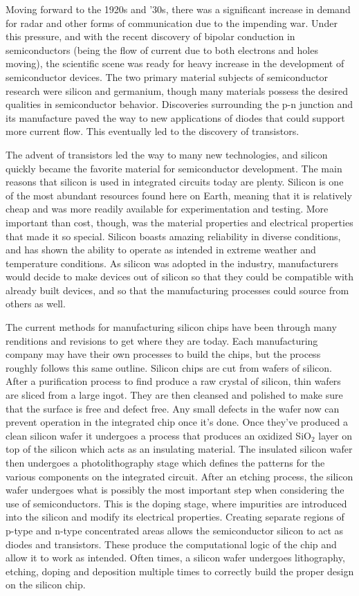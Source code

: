 \documentclass[12pt]{article}
\begin{document}
\begin{flushleft}
Moving forward to the 1920s and '30s, there was a significant
increase in demand for radar and other forms of communication
due to the impending war. Under this pressure, and
with the recent discovery of bipolar conduction in
semiconductors (being the flow of current due to both
electrons and holes moving), the scientific scene was
ready for heavy increase in the development of semiconductor
devices. The two primary material subjects of semiconductor
research were silicon and germanium, though many materials
possess the desired qualities in semiconductor behavior.
Discoveries surrounding the p-n junction and its manufacture
paved the way to new applications of diodes that could
support more current flow. This eventually led to the
discovery of transistors.

The advent of transistors led the way to many new technologies,
and silicon quickly became the favorite material for
semiconductor development. The main reasons that silicon
is used in integrated circuits today are plenty. Silicon
is one of the most abundant resources found here on
Earth, meaning that it is relatively cheap and was
more readily available for experimentation and testing.
More important than cost, though, was the material
properties and electrical properties that made it so
special. Silicon boasts amazing reliability in diverse
conditions, and has shown the ability to operate as
intended in extreme weather and temperature conditions.
As silicon was adopted in the industry, manufacturers
would decide to make devices out of silicon so that
they could be compatible with already built devices,
and so that the manufacturing processes could source
from others as well.

The current methods for manufacturing silicon chips
have been through many renditions and revisions to get
where they are today. Each manufacturing company may have
their own processes to build the chips, but the process
roughly follows this same outline.  Silicon chips are
cut from wafers of silicon. After a purification process
to find produce a raw crystal of silicon, thin wafers
are sliced from a large ingot.  They are then cleansed
and polished to make sure that the surface is free
and defect free. Any small defects in the wafer now
can prevent operation in the integrated chip once it's
done. Once they've produced a clean silicon wafer it
undergoes a process that produces an oxidized SiO$_2$
layer on top of the silicon which acts as an insulating
material. The insulated silicon wafer then undergoes
a photolithography stage which defines the patterns
for the various components on the integrated circuit.
After an etching process, the silicon wafer undergoes
what is possibly the most important step when considering
the use of semiconductors. This is the doping stage, where
impurities are introduced into the silicon and modify its
electrical properties. Creating separate regions of p-type
and n-type concentrated areas allows the semiconductor
silicon to act as diodes and transistors. These produce
the computational logic of the chip and allow it to
work as intended. Often times, a silicon wafer undergoes
lithography, etching, doping and deposition multiple
times to correctly build the proper design on the 
silicon chip.


\end{flushleft}
\end{document}
